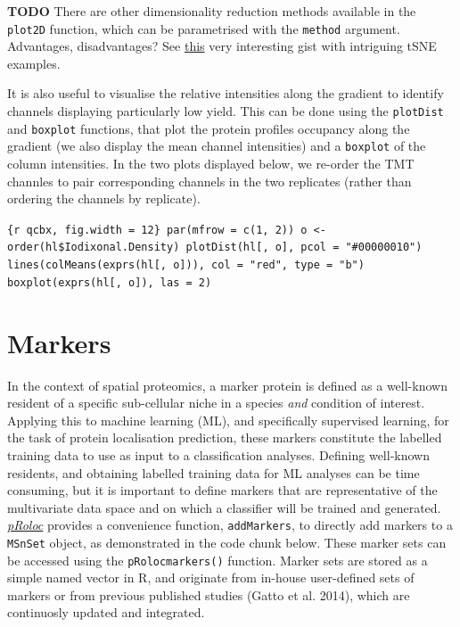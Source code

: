 \textbf{TODO} There are other dimensionality reduction methods available
in the \texttt{plot2D} function, which can be parametrised with the
\texttt{method} argument. Advantages, disadvantages? See
\href{https://gist.github.com/mikelove/74bbf5c41010ae1dc94281cface90d32}{this}
very interesting gist with intriguing tSNE examples.

It is also useful to visualise the relative intensities along the
gradient to identify channels displaying particularly low yield. This
can be done using the \texttt{plotDist} and \texttt{boxplot} functions,
that plot the protein profiles occupancy along the gradient (we also
display the mean channel intensities) and a \texttt{boxplot} of the
column intensities. In the two plots displayed below, we re-order the
TMT channles to pair corresponding channels in the two replicates
(rather than ordering the channels by replicate).

\texttt{\{r qcbx, fig.width = 12\} par(mfrow = c(1, 2)) o \textless{}- order(hl\$Iodixonal.Density) plotDist(hl{[}, o{]}, pcol = "\#00000010") lines(colMeans(exprs(hl{[}, o{]})), col = "red", type = "b") boxplot(exprs(hl{[}, o{]}), las = 2)}

\section{Markers}\label{markers}

In the context of spatial proteomics, a marker protein is defined as a
well-known resident of a specific sub-cellular niche in a species
\emph{and} condition of interest. Applying this to machine learning
(ML), and specifically supervised learning, for the task of protein
localisation prediction, these markers constitute the labelled training
data to use as input to a classification analyses. Defining well-known
residents, and obtaining labelled training data for ML analyses can be
time consuming, but it is important to define markers that are
representative of the multivariate data space and on which a classifier
will be trained and generated.
\emph{\href{http://bioconductor.org/packages/pRoloc}{pRoloc}} provides a
convenience function, \texttt{addMarkers}, to directly add markers to a
\texttt{MSnSet} object, as demonstrated in the code chunk below. These
marker sets can be accessed using the \texttt{pRolocmarkers()} function.
Marker sets are stored as a simple named vector in R, and originate from
in-house user-defined sets of markers or from previous published studies
(Gatto et al. 2014), which are continuosly updated and integrated.

